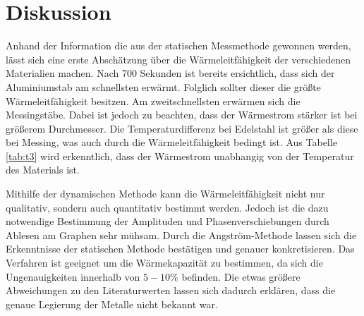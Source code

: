 \section{Diskussion}
\label{sec:Diskussion}
Anhand der Information die aus der statischen Messmethode gewonnen werden, lässt sich eine erste Abschätzung über die Wärmeleitfähigkeit der verschiedenen Materialien machen.
Nach 700 Sekunden ist bereits ersichtlich, dass sich der Aluminiumstab am schnellsten erwärmt.
Folglich sollter dieser die größte Wärmeleitfähigkeit besitzen.
Am zweitschnellsten erwärmen sich die Messingstäbe.
Dabei ist jedoch zu beachten, dass der Wärmestrom stärker ist bei größerem Durchmesser.
Die Temperaturdifferenz bei Edelstahl ist größer als diese bei Messing, was auch durch die Wärmeleitfähigkeit bedingt ist.
Aus Tabelle \ref{tab:t3} wird erkenntlich, dass der Wärmestrom unabhangig von der Temperatur des Materials ist.

Mithilfe der dynamischen Methode kann die Wärmeleitfähigkeit nicht nur qualitativ, sondern auch quantitativ bestimmt werden.
Jedoch ist die dazu notwendige Bestimmung der Amplituden und Phasenverschiebungen durch Ablesen am Graphen sehr mühsam.
Durch die Angström-Methode lassen sich die Erkenntnisse der statischen Methode bestätigen und genauer konkretisieren.
Das Verfahren ist geeignet um die Wärmekapazität zu bestimmen, da sich die Ungenauigkeiten innerhalb von $5-10\%$ befinden.
Die etwas größere Abweichungen zu den Literaturwerten\cite{waermeleit} lassen sich dadurch erklären, dass die genaue Legierung der Metalle nicht bekannt war.
